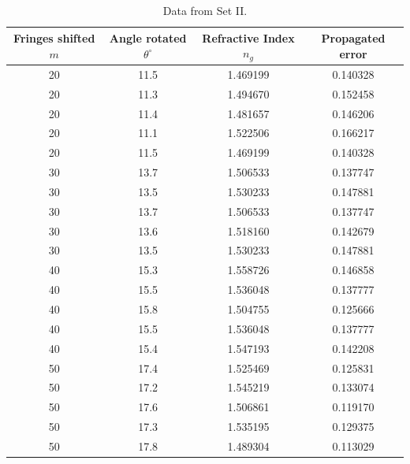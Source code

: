\documentclass[11pt]{article}
\begin{document}
        \begin{table}[H]
                \centering
                \caption{Data from Set II.}
                \begin{tabular}{c|c|c|c}\hline
                Fringes shifted $m$&  Angle rotated $\theta^\circ$ &  Refractive Index $n_g$&     Propagated error \\\hline\hline
                    20 &           11.5 &          1.469199 &  0.140328 \\
                    20 &           11.3 &          1.494670 &  0.152458 \\
                    20 &           11.4 &          1.481657 &  0.146206 \\
                    20 &           11.1 &          1.522506 &  0.166217 \\
                    20 &           11.5 &          1.469199 &  0.140328 \\
                    30 &           13.7 &          1.506533 &  0.137747 \\
                    30 &           13.5 &          1.530233 &  0.147881 \\
                    30 &           13.7 &          1.506533 &  0.137747 \\
                    30 &           13.6 &          1.518160 &  0.142679 \\
                    30 &           13.5 &          1.530233 &  0.147881 \\
                    40 &           15.3 &          1.558726 &  0.146858 \\
                    40 &           15.5 &          1.536048 &  0.137777 \\
                    40 &           15.8 &          1.504755 &  0.125666 \\
                    40 &           15.5 &          1.536048 &  0.137777 \\
                    40 &           15.4 &          1.547193 &  0.142208 \\
                    50 &           17.4 &          1.525469 &  0.125831 \\
                    50 &           17.2 &          1.545219 &  0.133074 \\
                    50 &           17.6 &          1.506861 &  0.119170 \\
                    50 &           17.3 &          1.535195 &  0.129375 \\
                    50 &           17.8 &          1.489304 &  0.113029 \\
                \hline
                \end{tabular}
                \label{tab:data_2}
        \end{table}
\end{document}

